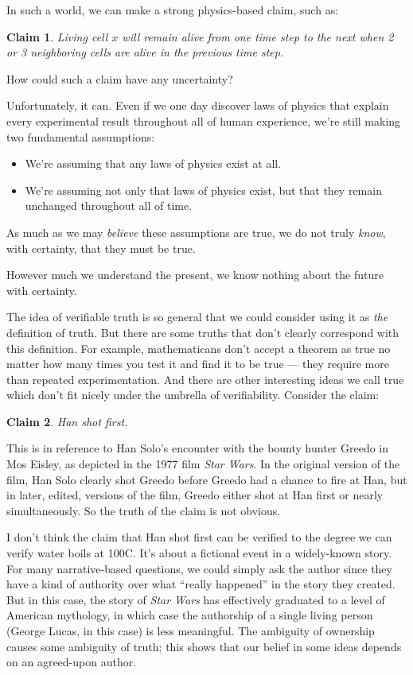 \documentclass[11pt, oneside]{article}
\newtheorem*{claim}{Claim}
\begin{document}
In such a world, we can make a strong physics-based claim, such as:
\begin{claim}
    Living cell $x$ will remain alive from one time step to the next when 2 or 3
    neighboring cells are alive in the previous time step.
\end{claim}

How could such a claim have any uncertainty?

Unfortunately, it can. Even if we one day discover laws of physics that
explain every experimental result throughout all of human
experience, we're still making two fundamental assumptions:
\begin{itemize}
    \item We're assuming that any laws of physics exist at all.
    \item We're assuming not only that laws of physics exist, but that they
        remain unchanged throughout all of time.
\end{itemize}
As much as we may {\em believe} these assumptions are true, we do not truly {\em
know}, with certainty, that they must be true.

However much we understand the present, we know nothing about
the future with certainty.

The idea of verifiable truth is so general that we could consider using it as
{\em the} definition of truth.
But there are some truths that don't clearly correspond with this definition.
For example, mathematicans don't accept a theorem as true no
matter how many times you test it and find it to be true --- they require
more than repeated experimentation.
And there are other interesting ideas we call true
which don't fit nicely under the umbrella of verifiability.
Consider the claim:
\begin{claim}\label{c2}
    Han shot first.
\end{claim}
This is in reference to Han Solo's encounter with the bounty hunter Greedo in
Mos Eisley, as depicted in the 1977 film {\em Star Wars}.
In the original version of the film, Han Solo clearly shot Greedo before Greedo
had a chance to
fire at Han, but in later, edited, versions of the film, Greedo either shot at
Han first or nearly simultaneously. So the truth of the claim is not
obvious.

I don't think the claim that Han shot first
can be verified to the degree we can verify
water boils at 100\degree C.
It's about a fictional event in a widely-known story.
For many narrative-based questions, we could simply ask the author since they
have a kind of authority over what ``really happened'' in the story they
created. But in this case, the story of {\em Star Wars} has effectively
graduated to a level of American mythology, in which case the authorship of a
single living person (George Lucas, in this case) is less meaningful.
The ambiguity of ownership causes some ambiguity of truth;
this shows that our belief in some ideas depends on an agreed-upon author.
\end{document}
